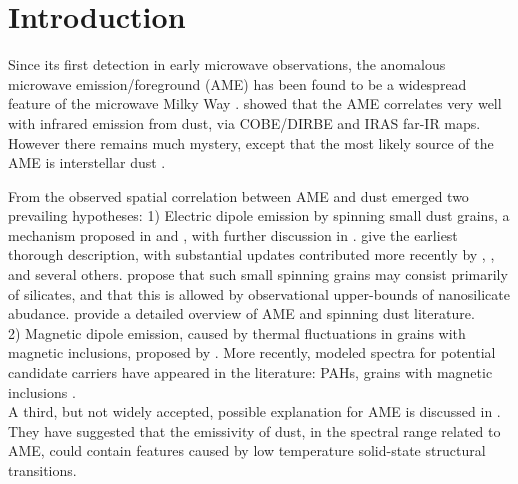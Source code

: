 \documentclass[preprint2,longabstract]{aastex}
\begin{document}


\maketitle

\section{Introduction}

     Since its first detection in early microwave observations, the anomalous microwave emission/foreground (AME) has been found to be a widespread feature of the microwave Milky Way \citep{dickinson13r}. \cite{kogut96,deoliveiracosta97,leitch98} showed that the AME correlates very well with infrared emission from dust, via COBE/DIRBE and IRAS far-IR maps. However there remains much mystery, except that the most likely source of the AME is interstellar dust \citep{ysard10a,tibbs11,hensley16}.

     From the observed spatial correlation between AME and dust emerged two prevailing hypotheses:
    1) Electric dipole emission by spinning small dust grains, a mechanism proposed in \cite{erickson57} and \cite{hoyle70}, with further discussion in \cite{ferrara94}. \cite{draine98b} give the earliest thorough description, with substantial updates contributed more recently by \cite{ysard10a}, \cite{ali-haimoud09}, \cite{hoang10} and several others. \cite{hensley17a} propose that such small spinning grains may consist primarily of silicates, and that this is allowed by observational upper-bounds of nanosilicate abudance. \cite{dickinson13r} provide a detailed overview of AME and spinning dust literature. \\
    2) Magnetic dipole emission, caused by thermal fluctuations in grains with magnetic inclusions, proposed by \cite{draine99}.
     More recently, modeled spectra for potential candidate carriers have appeared in the literature: PAHs, grains with magnetic inclusions \citep{draine13, ali-haimoud14, hoang16a}.\\

    A third, but not widely accepted, possible explanation for AME is discussed in \cite{jones09}. They have suggested that the emissivity of dust, in the spectral range related to AME, could contain features caused by low temperature solid-state structural transitions.
\end{document}
